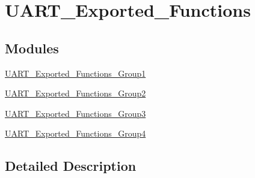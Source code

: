 \hypertarget{group___u_a_r_t___exported___functions}{}\section{U\+A\+R\+T\+\_\+\+Exported\+\_\+\+Functions}
\label{group___u_a_r_t___exported___functions}
\subsection*{Modules}
\begin{DoxyCompactItemize}
\item 
\hyperlink{group___u_a_r_t___exported___functions___group1}{U\+A\+R\+T\+\_\+\+Exported\+\_\+\+Functions\+\_\+\+Group1}
\item 
\hyperlink{group___u_a_r_t___exported___functions___group2}{U\+A\+R\+T\+\_\+\+Exported\+\_\+\+Functions\+\_\+\+Group2}
\item 
\hyperlink{group___u_a_r_t___exported___functions___group3}{U\+A\+R\+T\+\_\+\+Exported\+\_\+\+Functions\+\_\+\+Group3}
\item 
\hyperlink{group___u_a_r_t___exported___functions___group4}{U\+A\+R\+T\+\_\+\+Exported\+\_\+\+Functions\+\_\+\+Group4}
\end{DoxyCompactItemize}


\subsection{Detailed Description}
